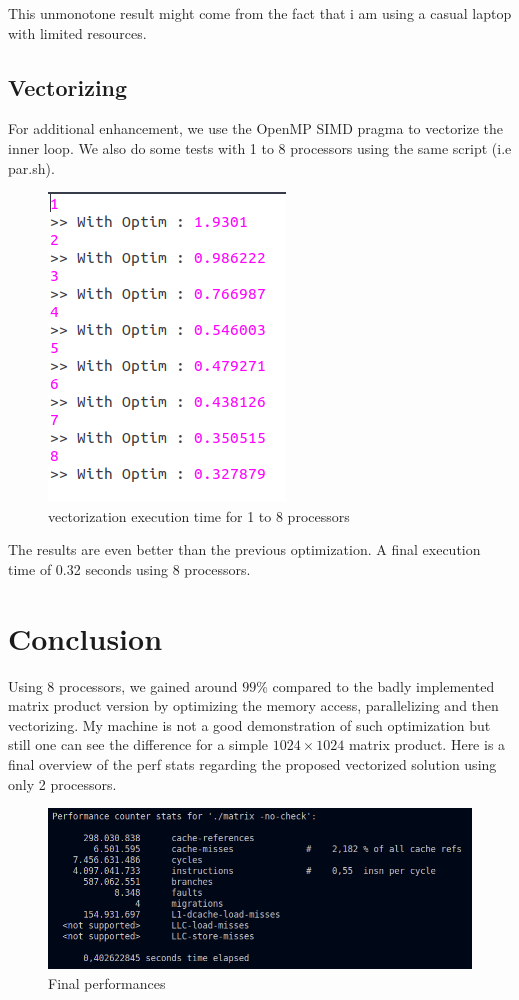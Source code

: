 \documentclass[a4paper, 10 pt, conference]{ieeeconf}
\begin{document}
This unmonotone result might come from the fact that i am using a casual laptop with limited resources.

\subsection{Vectorizing}
For additional enhancement, we use the OpenMP SIMD pragma to vectorize the inner loop. We also do some tests with 1 to 8 processors using the same script (i.e par.sh).

\begin{figure}[h!]
  \center \includegraphics[scale=0.4]{pics/vec.png}
  \caption{vectorization execution time for 1 to 8 processors}
  \label{}
\end{figure}

The results are even better than the previous optimization. A final execution time of 0.32 seconds using 8 processors.



\section{Conclusion}
Using 8 processors, we gained around $99\%$ compared to the badly implemented matrix product version by optimizing the memory access, parallelizing and then vectorizing. My machine is not a good demonstration of such optimization but still one can see the difference for a simple $1024\times1024$ matrix product. Here is a final overview of the perf stats regarding the proposed vectorized solution using only 2 processors.
\newpage
\begin{figure}[]
  \includegraphics[scale=0.3]{pics/final.png}
  \caption{Final performances}
  \label{}
\end{figure}
\end{document}

